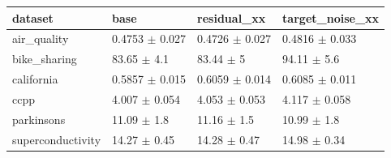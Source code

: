 \begin{tabular}{llll}
\toprule
dataset & base & residual\_xx & target\_noise\_xx \\
\midrule
air\_quality & 0.4753 $\pm$ 0.027 & 0.4726 $\pm$ 0.027 & 0.4816 $\pm$ 0.033 \\
bike\_sharing & 83.65 $\pm$ 4.1 & 83.44 $\pm$ 5 & 94.11 $\pm$ 5.6 \\
california & 0.5857 $\pm$ 0.015 & 0.6059 $\pm$ 0.014 & 0.6085 $\pm$ 0.011 \\
ccpp & 4.007 $\pm$ 0.054 & 4.053 $\pm$ 0.053 & 4.117 $\pm$ 0.058 \\
parkinsons & 11.09 $\pm$ 1.8 & 11.16 $\pm$ 1.5 & 10.99 $\pm$ 1.8 \\
superconductivity & 14.27 $\pm$ 0.45 & 14.28 $\pm$ 0.47 & 14.98 $\pm$ 0.34 \\
\bottomrule
\end{tabular}
